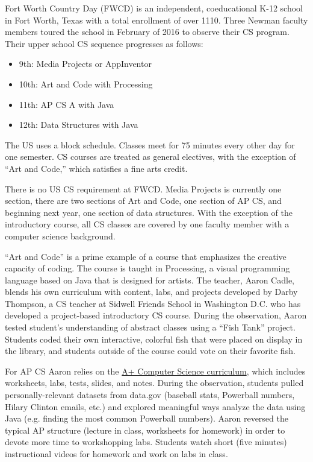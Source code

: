 	
Fort Worth Country Day (FWCD) is an independent, coeducational K-12 school in Fort Worth, Texas with a total enrollment of over 1110. Three Newman faculty members toured the school in February of 2016 to observe their CS program. Their upper school CS sequence progresses as follows: 
\begin{itemize}
	\item 9th: Media Projects or AppInventor
	\item 10th: Art and Code with Processing
	\item 11th: AP CS A with Java
	\item 12th: Data Structures with Java
\end{itemize}
The US uses a block schedule. Classes meet for 75 minutes every other day for one semester. CS courses are treated as general electives, with the exception of “Art and Code,” which satisfies a fine arts credit. \par
There is no US CS requirement at FWCD. Media Projects is currently one section, there are two sections of Art and Code, one section of AP CS, and beginning next year, one section of data structures. With the exception of the introductory course, all CS classes are covered by one faculty member with a computer science background. \par
``Art and Code'' is a prime example of a course that emphasizes the creative capacity of coding. The course is taught in Processing, a visual programming language based on Java that is designed for artists. The teacher, Aaron Cadle, blends his own curriculum with content, labs, and projects developed by Darby Thompson, a CS teacher at Sidwell Friends School in Washington D.C. who has developed a project-based introductory CS course. During the observation, Aaron tested student’s understanding of abstract classes using a “Fish Tank” project. Students coded their own interactive, colorful fish that were placed on display in the library, and students outside of the course could vote on their favorite fish. \par
For AP CS Aaron relies on the \href{http://apluscompsci.com/}{A+ Computer Science curriculum}, which includes worksheets, labs, tests, slides, and notes. During the observation, students pulled personally-relevant datasets from data.gov (baseball stats, Powerball numbers, Hilary Clinton emails, etc.) and explored meaningful ways analyze the data using Java (e.g. finding the most common Powerball numbers). Aaron reversed the typical AP structure (lecture in class, worksheets for homework) in order to devote more time to workshopping labs. Students watch short (five minutes) instructional videos for homework and work on labs in class. \par

